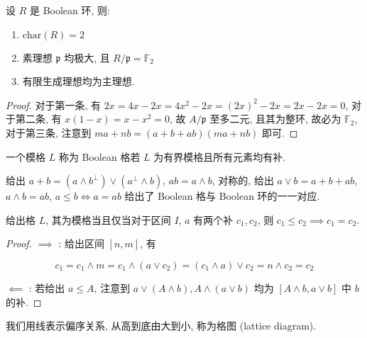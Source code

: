 \begin{lemma}
    设 \(R\) 是 Boolean 环, 则:

    \begin{enumerate}
        \item \(\mathrm{char} (R) = 2\)
        \item 素理想 \(\mathfrak{p}\) 均极大, 且 \(R / \mathfrak{p} = \mathbb{F}_2\)
        \item 有限生成理想均为主理想.
    \end{enumerate}

    \begin{proof}
        对于第一条, 有 \(2x = 4x - 2x = 4x^2 - 2x = {(2x)}^2 - 2x = 2x - 2x = 0\),
        对于第二条, 有 \(x (1-x) = x - x^2 = 0\), 故 \(A / \mathfrak{p}\) 至多二元, 且其为整环, 故必为 \(\mathbb{F}_2\),
        对于第三条, 注意到 \(ma + nb = (a + b + ab) (ma + nb)\) 即可.
    \end{proof}
\end{lemma}

\begin{definition}[Boolean 格]
    一个模格 \(L\) 称为 Boolean 格若 \(L\) 为有界模格且所有元素均有补.
\end{definition}

\begin{lemma}
    给出 \(a + b = (a \wedge b^{\bot}) \vee (a^{\bot} \wedge b)\), \(ab = a \wedge b\), 对称的, 给出
    \(a \vee b = a + b + ab\), \(a \wedge b = ab\), \(a \leq b \iff a = ab\) 给出了 Boolean 格与 Boolean 环的一一对应.
\end{lemma}

\begin{lemma}
    给出格 \(L\), 其为模格当且仅当对于区间 \(I\), \(a\) 有两个补 \(c_1,c_2\), 则 \(c_1 \leq c_2 \implies c_1 = c_2\).

    \begin{proof}
        \(\implies\) : 给出区间 \([n,m]\), 有 
        
        \[
            c_1 = c_1 \wedge m = c_1 \wedge (a \vee c_2) = (c_1 \wedge a) \vee c_2 = n \wedge c_2 = c_2
        \]

        \(\impliedby\) : 若给出 \(a \leq A\), 注意到 \(a \vee (A \wedge b),A \wedge (a \vee b)\) 均为 \([A \wedge b,a \vee b]\) 中 \(b\) 的补.
    \end{proof}
\end{lemma}

\begin{definition}[格图]
    我们用线表示偏序关系, 从高到底由大到小, 称为格图 (lattice diagram).
\end{definition}

